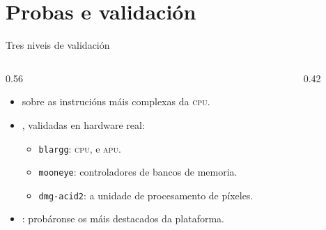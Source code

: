 \section{Probas e validación}

\begin{frame}{Tres niveis de validación}
  \begin{columns}[c]
    \begin{column}{0.56\textwidth}
      \footnotesize
      \begin{itemize}
        \item {} sobre as instrucións máis complexas
        da \textsc{cpu}.

        \item {}, validadas en hardware real:
          \begin{itemize}
            \item \texttt{blargg}: \textsc{cpu}, e \textsc{apu}.
            \item \texttt{mooneye}: controladores de bancos de memoria.
            \item \texttt{dmg-acid2}: a unidade de procesamento de píxeles.
          \end{itemize}

        \item {}: probáronse os máis destacados da plataforma.

      \end{itemize}
    \end{column}
    \begin{column}{0.42\textwidth}
    \end{column}
  \end{columns}
\end{frame}

